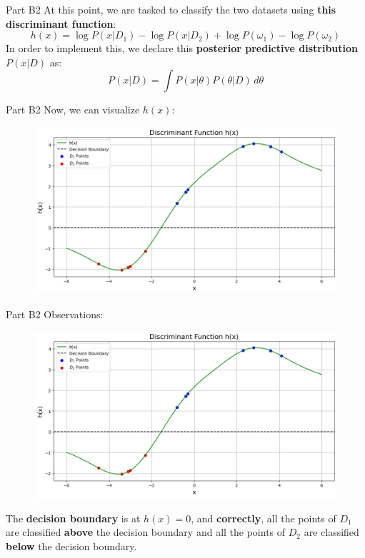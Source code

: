 \documentclass{beamer}
\begin{document}
    \begin{frame}{Part B2}
    At this point, we are tasked to classify the two datasets using \textbf{this discriminant function}:
    $$
    h(x) = \log{P(x|D_1)} - \log{P(x|D_2)} + \log{P(\omega_1)} - \log{P(\omega_2)}
    $$
    In order to implement this, we declare this \textbf{posterior predictive distribution} ${P(x|D)}$ as:
    $$
    P(x|D)={\int P(x|\theta)P(\theta|D) \, d\theta}
    $$
    \end{frame}

    \begin{frame}{Part B2}
    Now, we can visualize $h(x)$:
    \begin{figure}
        \centering
        \includegraphics[width=1\linewidth]{B2.png}
        \label{Graph B1}
    \end{figure}
    \end{frame}

    \begin{frame}{Part B2}
    Observations:
    \begin{figure}
        \centering
        \includegraphics[width=0.75\linewidth]{B2.png}
        \label{Graph C1}
    \end{figure}
    The \textbf{decision boundary} is at $h(x)=0$, and \textbf{correctly}, all the points of $D_1$ are classified \textbf{above} the decision boundary and all the points of $D_2$ are classified \textbf{below} the decision boundary.
    \end{frame}
\end{document}
